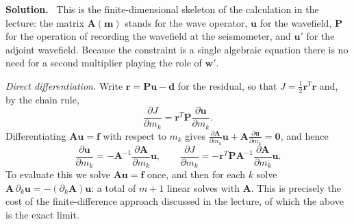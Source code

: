\documentclass[a4paper,12pt]{paper}
\newenvironment{solution}{\par\noindent\textbf{Solution.}\ }{\par\medskip}
\begin{document}
\begin{solution}
This is the finite-dimensional skeleton of the calculation in the lecture: the matrix $\mathbf{A}(\mathbf{m})$ stands for
the wave operator, $\mathbf{u}$ for the wavefield, $\mathbf{P}$ for the operation of recording the wavefield at the seismometer,
and $\mathbf{u}'$ for the adjoint wavefield. Because the constraint is a single algebraic equation there is no need for a second
multiplier playing the role of $\mathbf{w}'$.

\emph{Direct differentiation.} Write $\mathbf{r}=\mathbf{P}\mathbf{u}-\mathbf{d}$ for the residual, so that
$J=\frac{1}{2}\mathbf{r}^{T}\mathbf{r}$ and, by the chain rule,
\begin{equation}
\frac{\partial J}{\partial m_{k}}=\mathbf{r}^{T}\mathbf{P}\frac{\partial\mathbf{u}}{\partial m_{k}}.
\label{eq:1}
\end{equation}
Differentiating $\mathbf{A}\mathbf{u}=\mathbf{f}$ with respect to $m_{k}$ gives
$\frac{\partial\mathbf{A}}{\partial m_{k}}\mathbf{u}+\mathbf{A}\frac{\partial\mathbf{u}}{\partial m_{k}}=\mathbf{0}$, and hence
\begin{equation}
\frac{\partial\mathbf{u}}{\partial m_{k}}=-\mathbf{A}^{-1}\frac{\partial\mathbf{A}}{\partial m_{k}}\mathbf{u},\qquad
\frac{\partial J}{\partial m_{k}}=-\mathbf{r}^{T}\mathbf{P}\mathbf{A}^{-1}\frac{\partial\mathbf{A}}{\partial m_{k}}\mathbf{u}.
\label{eq:2}
\end{equation}
To evaluate this we solve $\mathbf{A}\mathbf{u}=\mathbf{f}$ once, and then for each $k$ solve
$\mathbf{A}\,\partial_{k}\mathbf{u}=-(\partial_{k}\mathbf{A})\mathbf{u}$: a total of $m+1$ linear solves with $\mathbf{A}$.
This is precisely the cost of the finite-difference approach discussed in the lecture, of which the above is the exact limit.


\end{solution}
\end{document}
